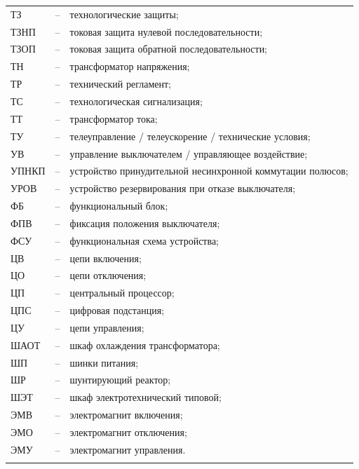 \begin{longtable}{>{\raggedright\arraybackslash}m{2cm}>{\raggedright\arraybackslash}m{0.5cm}>{\raggedright\arraybackslash}m{20cm}}
ТЗ & -- & технологические защиты; \\
ТЗНП & -- & токовая защита нулевой последовательности; \\
ТЗОП & -- & токовая защита обратной последовательности; \\
ТН & -- & трансформатор напряжения; \\
ТР & -- & технический регламент; \\
ТС & -- & технологическая сигнализация; \\
ТТ & -- & трансформатор тока; \\
ТУ & -- & телеуправление / телеускорение / технические условия; \\
УВ & -- & управление выключателем / управляющее воздействие; \\
УПНКП & -- & устройство принудительной несинхронной коммутации полюсов; \\
УРОВ & -- & устройство резервирования при отказе выключателя; \\
ФБ & -- & функциональный блок; \\
ФПВ & -- & фиксация положения выключателя; \\
ФСУ & -- & функциональная схема устройства; \\
ЦВ & -- & цепи включения; \\
ЦО & -- & цепи отключения; \\
ЦП & -- & центральный процессор; \\
ЦПС & -- & цифровая подстанция; \\
ЦУ & -- & цепи управления; \\
ШАОТ & -- & шкаф охлаждения трансформатора; \\
ШП & -- & шинки питания; \\
ШР & -- & шунтирующий реактор; \\
ШЭТ & -- & шкаф электротехнический типовой; \\
ЭМВ & -- & электромагнит включения; \\
ЭМО & -- & электромагнит отключения; \\
ЭМУ & -- & электромагнит управления. \\
{\color{white}\fontsize{0.1pt}{0.1pt}\selectfont<endABBRS>}
\end{longtable}
